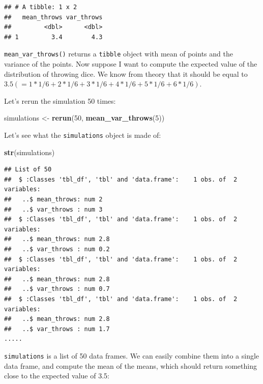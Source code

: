 \documentclass[]{gitbook}
\newenvironment{Shaded}{\begin{snugshade}}{\end{snugshade}}
\newcommand{\DataTypeTok}[1]{\textcolor[rgb]{0.13,0.29,0.53}{#1}}
\newcommand{\DecValTok}[1]{\textcolor[rgb]{0.00,0.00,0.81}{#1}}
\newcommand{\KeywordTok}[1]{\textcolor[rgb]{0.13,0.29,0.53}{\textbf{#1}}}
\newcommand{\NormalTok}[1]{#1}
\newcommand{\OperatorTok}[1]{\textcolor[rgb]{0.81,0.36,0.00}{\textbf{#1}}}
\newcommand{\StringTok}[1]{\textcolor[rgb]{0.31,0.60,0.02}{#1}}
\begin{document}
\begin{verbatim}
## # A tibble: 1 x 2
##   mean_throws var_throws
##         <dbl>      <dbl>
## 1         3.4        4.3
\end{verbatim}

\texttt{mean\_var\_throws()} returns a \texttt{tibble} object with mean of points and the variance of the points. Now suppose
I want to compute the expected value of the distribution of throwing dice. We know from theory that it should
be equal to \(3.5 (= 1*1/6 + 2*1/6 + 3*1/6 + 4*1/6 + 5*1/6 + 6*1/6)\).

Let's rerun the simulation 50 times:

\begin{Shaded}
\begin{Highlighting}[]
\NormalTok{simulations <-}\StringTok{ }\KeywordTok{rerun}\NormalTok{(}\DecValTok{50}\NormalTok{, }\KeywordTok{mean_var_throws}\NormalTok{(}\DecValTok{5}\NormalTok{))}
\end{Highlighting}
\end{Shaded}

Let's see what the \texttt{simulations} object is made of:

\begin{Shaded}
\begin{Highlighting}[]
\KeywordTok{str}\NormalTok{(simulations)}
\end{Highlighting}
\end{Shaded}

\begin{verbatim}
## List of 50
##  $ :Classes 'tbl_df', 'tbl' and 'data.frame':    1 obs. of  2 variables:
##   ..$ mean_throws: num 2
##   ..$ var_throws : num 3
##  $ :Classes 'tbl_df', 'tbl' and 'data.frame':    1 obs. of  2 variables:
##   ..$ mean_throws: num 2.8
##   ..$ var_throws : num 0.2
##  $ :Classes 'tbl_df', 'tbl' and 'data.frame':    1 obs. of  2 variables:
##   ..$ mean_throws: num 2.8
##   ..$ var_throws : num 0.7
##  $ :Classes 'tbl_df', 'tbl' and 'data.frame':    1 obs. of  2 variables:
##   ..$ mean_throws: num 2.8
##   ..$ var_throws : num 1.7
.....
\end{verbatim}

\texttt{simulations} is a list of 50 data frames. We can easily combine them into a single data frame, and compute the
mean of the means, which should return something close to the expected value of 3.5:

\begin{Shaded}
\end{Shaded}
\end{document}
